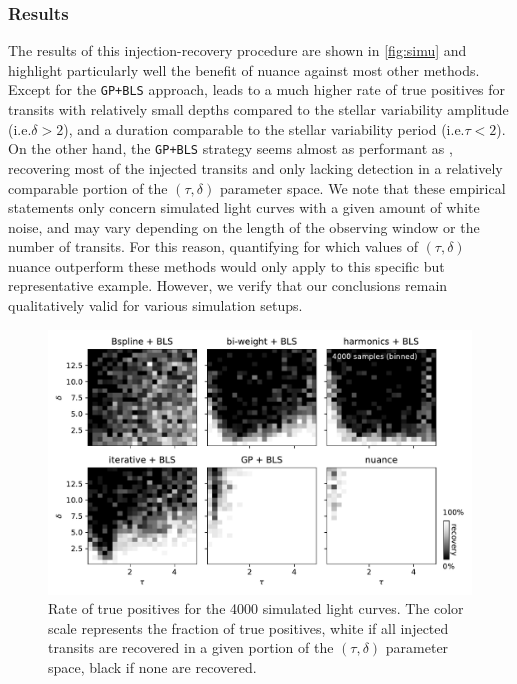 \documentclass[modern]{aastex631}
\begin{document}
\subsubsection*{Results}
The results of this injection-recovery procedure are shown in \autoref{fig:simu} and highlight particularly well the benefit of \textsf{nuance} against most other methods. Except for the \texttt{GP+BLS} approach, \nuancecode{} leads to a much higher rate of true positives for transits with relatively small depths compared to the stellar variability amplitude (i.e.\;$\delta>2$), and a duration comparable to the stellar variability period (i.e.\;$\tau<2$). On the other hand, the \texttt{GP+BLS} strategy seems almost as performant as \nuancecode, recovering most of the injected transits and only lacking detection in a relatively comparable portion of the $(\tau, \delta)$ parameter space. We note that these empirical statements only concern simulated light curves with a given amount of white noise, and may vary depending on the length of the observing window or the number of transits. For this reason, quantifying for which values of $(\tau, \delta)$ \textsf{nuance} outperform these methods would only apply to this specific but representative example. However, we verify that our conclusions remain qualitatively valid for various simulation setups.
\begin{figure}[H]
    \begin{centering}
        \includegraphics[width=\linewidth]{./synthetic_ir.pdf}
        \caption{Rate of true positives for the 4000 simulated light curves. The color scale represents the fraction of true positives, white if all injected transits are recovered in a given portion of the $(\tau, \delta)$ parameter space, black if none are recovered. }
        \label{fig:simu}
    \end{centering}
\end{figure}
\end{document}
